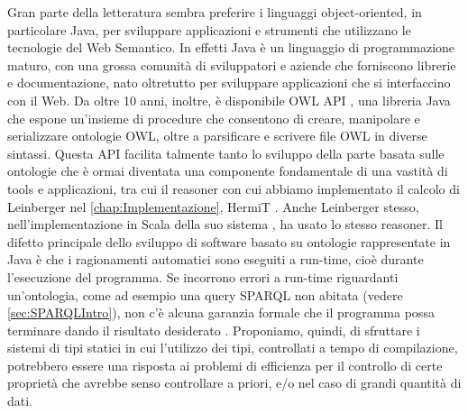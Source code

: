 Gran parte della letteratura sembra preferire i linguaggi object-oriented, in particolare Java, per sviluppare applicazioni e strumenti che utilizzano le tecnologie del Web Semantico. In effetti Java è un linguaggio di programmazione maturo, con una grossa comunità di sviluppatori e aziende che forniscono librerie e documentazione, nato oltretutto per sviluppare applicazioni che si interfaccino con il Web. Da oltre 10 anni, inoltre, è disponibile OWL API \cite{OWLAPI}, una libreria Java che espone un'insieme di procedure che consentono di creare, manipolare e serializzare ontologie OWL, oltre a parsificare e scrivere file OWL in diverse sintassi. Questa API facilita talmente tanto lo sviluppo della parte basata sulle ontologie che è ormai diventata una componente fondamentale di una vastità di tools e applicazioni, tra cui il reasoner con cui abbiamo implementato il calcolo di Leinberger nel \autoref{chap:Implementazione}, HermiT \cite{HermiTWhitepaper}. Anche Leinberger stesso, nell'implementazione in Scala della suo sistema \cite{leinbergerScalaImpl}, ha usato lo stesso reasoner. Il difetto principale dello sviluppo di software basato su ontologie rappresentate in Java è che i ragionamenti automatici sono eseguiti a run-time, cioè durante l'esecuzione del programma. Se incorrono errori a run-time riguardanti un'ontologia, come ad esempio una query SPARQL non abitata (vedere \autoref{sec:SPARQLIntro}), non c'è alcuna garanzia formale che il programma possa terminare dando il risultato desiderato \cite{leinbergerphdthesis}. Proponiamo, quindi, di sfruttare i sistemi di tipi statici in cui l'utilizzo dei tipi, controllati a tempo di compilazione, potrebbero essere una risposta ai problemi di efficienza per il controllo di certe proprietà che avrebbe senso controllare a priori, e/o nel caso di grandi quantità di dati.

